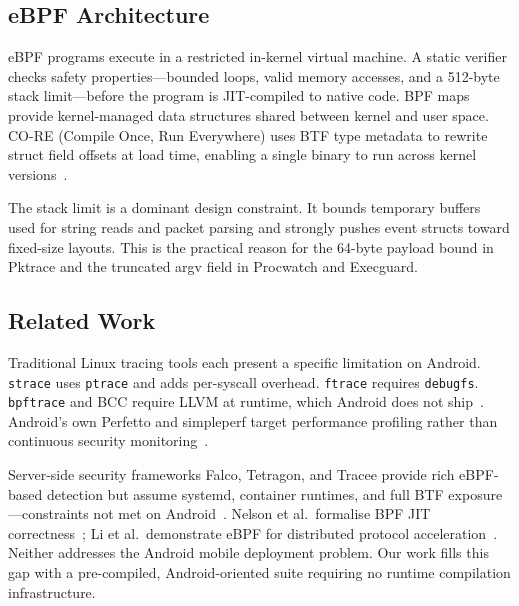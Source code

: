 \documentclass[conference]{IEEEtran}
\begin{document}
\subsection{eBPF Architecture}
eBPF programs execute in a restricted in-kernel virtual machine. A static verifier checks safety properties---bounded loops, valid memory accesses, and a 512-byte stack limit---before the program is JIT-compiled to native code. BPF maps provide kernel-managed data structures shared between kernel and user space. CO-RE (Compile Once, Run Everywhere) uses BTF type metadata to rewrite struct field offsets at load time, enabling a single binary to run across kernel versions~\cite{ebpf_linux_doc,libbpf_doc}.

The stack limit is a dominant design constraint. It bounds temporary buffers used for string reads and packet parsing and strongly pushes event structs toward fixed-size layouts. This is the practical reason for the 64-byte payload bound in Pktrace and the truncated argv field in Procwatch and Execguard.

\subsection{Related Work}
Traditional Linux tracing tools each present a specific limitation on Android. \texttt{strace} uses \texttt{ptrace} and adds per-syscall overhead. \texttt{ftrace} requires \texttt{debugfs}. \texttt{bpftrace} and BCC require LLVM at runtime, which Android does not ship~\cite{strace_doc,ftrace_doc,bpftrace_doc}. Android's own Perfetto and simpleperf target performance profiling rather than continuous security monitoring~\cite{android_perfetto,android_simpleperf}.

Server-side security frameworks Falco, Tetragon, and Tracee provide rich eBPF-based detection but assume systemd, container runtimes, and full BTF exposure---constraints not met on Android~\cite{falco_doc,tetragon_doc,tracee_doc}. Nelson et al.\ formalise BPF JIT correctness~\cite{bpf_jit_osdi2020}; Li et al.\ demonstrate eBPF for distributed protocol acceleration~\cite{electrode_nsdi2023}. Neither addresses the Android mobile deployment problem. Our work fills this gap with a pre-compiled, Android-oriented suite requiring no runtime compilation infrastructure.
\end{document}

